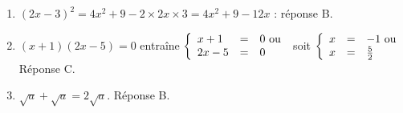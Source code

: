 
\medskip

%
%
%
\begin{enumerate}
\item $(2x - 3)^2 =  4x^2 + 9 - 2 \times 2x \times 3 = 4x^2 + 9 - 12x$ : réponse B.
\item $(x + 1)(2x - 5) = 0$ entraîne $\left\{\begin{array}{l c l}
x + 1&=&0\ \text{ou}\\
2x - 5&=&0
\end{array}\right.$ soit $\left\{\begin{array}{l c l}
x &=&- 1\ \text{ou}\\
x &=&\frac{5}{2}
\end{array}\right.$ Réponse C.
\item $\sqrt{a} + \sqrt{a} = 2\sqrt{a}$. Réponse B.
\end{enumerate}

\vspace{0,5cm}

